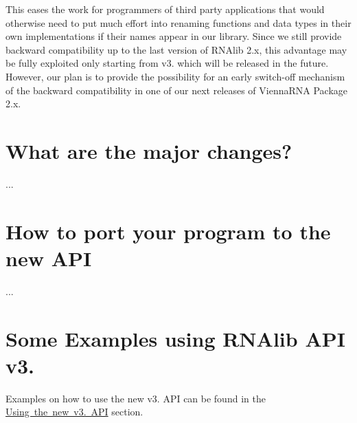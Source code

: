 This eases the work for programmers of third party applications that would otherwise need to put much effort into renaming functions and data types in their own implementations if their names appear in our library. Since we still provide backward compatibility up to the last version of R\+N\+Alib 2.\+x, this advantage may be fully exploited only starting from v3. which will be released in the future. However, our plan is to provide the possibility for an early switch-\/off mechanism of the backward compatibility in one of our next releases of Vienna\+R\+NA Package 2.\+x.\hypertarget{newAPI_newAPI_changes}{}\section{What are the major changes?}\label{newAPI_newAPI_changes}
...\hypertarget{newAPI_newAPI_porting}{}\section{How to port your program to the new A\+PI}\label{newAPI_newAPI_porting}
...\hypertarget{newAPI_newAPI_examples}{}\section{Some Examples using R\+N\+Alib A\+P\+I v3.}\label{newAPI_newAPI_examples}
Examples on how to use the new v3. A\+PI can be found in the \mbox{\hyperlink{mp_example_examples_c_new_API}{Using the \textquotesingle{}new\textquotesingle{} v3. A\+PI}} section. 